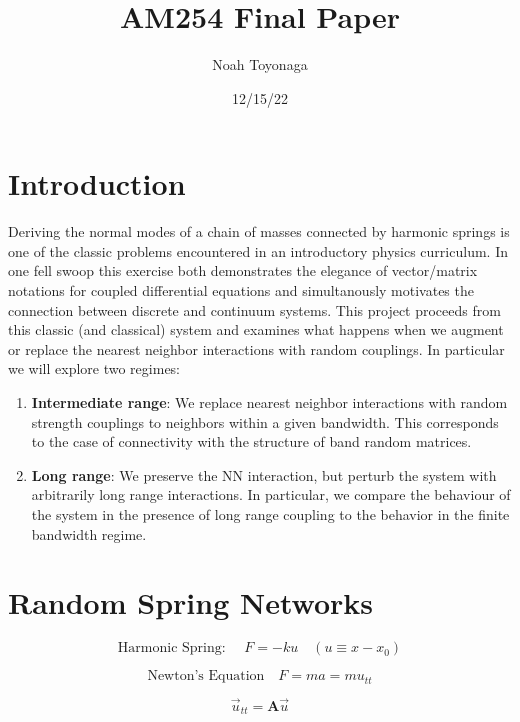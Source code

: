 \documentclass{article}
\title{AM254 Final Paper}
\author{Noah Toyonaga}
\date{12/15/22}
\begin{document}
\maketitle


\section{Introduction}
Deriving the normal modes of a chain of masses connected by harmonic springs is one of the 
classic problems encountered in an introductory physics curriculum.
In one fell swoop this exercise both demonstrates the elegance of 
vector/matrix notations for coupled differential equations 
and simultanously motivates the connection between discrete and continuum systems. 
This project proceeds from this classic (and classical) system
and examines what happens when we augment or replace the nearest neighbor interactions with random couplings. 
In particular we will explore two regimes:

\begin{enumerate}
	\item \textbf{Intermediate range}: We replace nearest neighbor interactions with random strength couplings to
		neighbors within a given bandwidth. 
		This corresponds to the case of connectivity with the structure of band random matrices. 
	\item \textbf{Long range}: We preserve the NN interaction, but perturb the system with arbitrarily long range interactions.
		In particular, we compare the behaviour of the system in the presence of long range coupling to the behavior in the finite bandwidth regime. 
\end{enumerate}




\section{Random Spring Networks}

\begin{equation}
	\text{Harmonic Spring: } \quad F = -k u \quad \left( u\equiv x - x_0\right)
\end{equation}


\begin{equation}
	\text{Newton's Equation} \quad F = m a = m u_{tt} 
\end{equation}

\begin{equation}
	\vec{u}_{tt} = \boldsymbol{A}\vec{u}
\end{equation}
\end{document}
